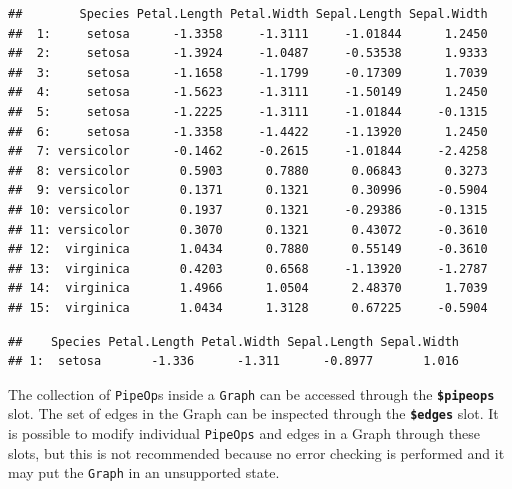 \documentclass[
]{scrbook}
\newenvironment{Shaded}{\begin{snugshade}}{\end{snugshade}}
\newcommand{\DecValTok}[1]{\textcolor[rgb]{0.00,0.00,0.81}{#1}}
\newcommand{\FunctionTok}[1]{\textcolor[rgb]{0.00,0.00,0.00}{#1}}
\newcommand{\NormalTok}[1]{#1}
\newcommand{\SpecialCharTok}[1]{\textcolor[rgb]{0.00,0.00,0.00}{#1}}
\renewenvironment{Shaded} {\begin{snugshade}\small} {\end{snugshade}}
\begin{document}
\begin{Shaded}
\end{Shaded}

\begin{verbatim}
##        Species Petal.Length Petal.Width Sepal.Length Sepal.Width
##  1:     setosa      -1.3358     -1.3111     -1.01844      1.2450
##  2:     setosa      -1.3924     -1.0487     -0.53538      1.9333
##  3:     setosa      -1.1658     -1.1799     -0.17309      1.7039
##  4:     setosa      -1.5623     -1.3111     -1.50149      1.2450
##  5:     setosa      -1.2225     -1.3111     -1.01844     -0.1315
##  6:     setosa      -1.3358     -1.4422     -1.13920      1.2450
##  7: versicolor      -0.1462     -0.2615     -1.01844     -2.4258
##  8: versicolor       0.5903      0.7880      0.06843      0.3273
##  9: versicolor       0.1371      0.1321      0.30996     -0.5904
## 10: versicolor       0.1937      0.1321     -0.29386     -0.1315
## 11: versicolor       0.3070      0.1321      0.43072     -0.3610
## 12:  virginica       1.0434      0.7880      0.55149     -0.3610
## 13:  virginica       0.4203      0.6568     -1.13920     -1.2787
## 14:  virginica       1.4966      1.0504      2.48370      1.7039
## 15:  virginica       1.0434      1.3128      0.67225     -0.5904
\end{verbatim}

\begin{Shaded}
\end{Shaded}

\begin{verbatim}
##    Species Petal.Length Petal.Width Sepal.Length Sepal.Width
## 1:  setosa       -1.336      -1.311      -0.8977       1.016
\end{verbatim}

The collection of \texttt{PipeOp}s inside a \texttt{Graph} can be accessed through the \textbf{\texttt{\$pipeops}} slot.
The set of edges in the Graph can be inspected through the \textbf{\texttt{\$edges}} slot.
It is possible to modify individual \texttt{PipeOps} and edges in a Graph through these slots, but this is not recommended because no error checking is performed and it may put the \texttt{Graph} in an unsupported state.
\end{document}
